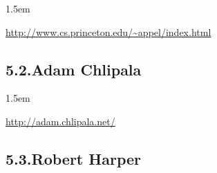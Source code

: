 \documentclass[12pt,twoside]{article}
\begin{document}
\begin{mddefinitions}%


\begin{mdbmarginx}{}{}{}{1.5em}%
\begin{mddefdata}%
\href{http://www.cs.princeton.edu/~appel/index.html}{{\ttfamily http://\hspace{0pt}www.\hspace{0pt}cs.\hspace{0pt}princeton.\hspace{0pt}edu/\hspace{0pt}\textasciitilde{}appel/\hspace{0pt}index.\hspace{0pt}html}}%
\end{mddefdata}%
\end{mdbmarginx}%
\end{mddefinitions}%

\subsection{5.2.\hspace*{0.5em}Adam Chlipala}\label{sec-adam-chlipala}%

\begin{mddefinitions}%


\begin{mdbmarginx}{}{}{}{1.5em}%
\begin{mddefdata}%
\href{http://adam.chlipala.net/}{{\ttfamily http://\hspace{0pt}adam.\hspace{0pt}chlipala.\hspace{0pt}net/\hspace{0pt}}}%
\end{mddefdata}%
\end{mdbmarginx}%
\end{mddefinitions}%

\subsection{5.3.\hspace*{0.5em}Robert Harper}\label{sec-robert-harper}%
\end{document}
